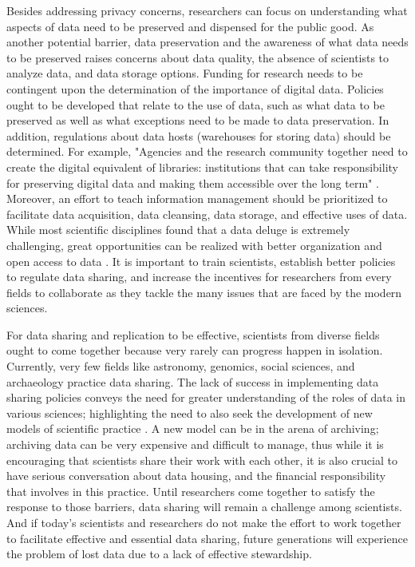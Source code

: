 \documentclass[sigconf]{acmart}
\begin{document}
Besides addressing privacy concerns, researchers can focus on understanding what aspects of data need to be preserved and dispensed for the public good. As another potential barrier, data preservation and the awareness of what data needs to be preserved raises concerns about data quality, the absence of scientists to analyze data, and data storage options. Funding for research needs to be contingent upon the determination of the importance of digital data. Policies ought to be developed that relate to the use of data, such as what data to be preserved as well as what exceptions need to be made to data preservation. In addition, regulations about data hosts (warehouses for storing data) should be determined. For example, "Agencies and the research community together need to create the digital equivalent of libraries: institutions that can take responsibility for preserving digital data and making them accessible over the long term" \cite{pryor2009skilling}.  Moreover, an effort to teach information management should be prioritized to facilitate data acquisition, data cleansing, data storage, and effective uses of data. While most scientific disciplines found that a data deluge is extremely challenging, great opportunities can be realized with better organization and open access to data \cite{economic22challenges}. It is important to train scientists, establish better policies to regulate data sharing, and increase the incentives for researchers from every fields to collaborate as they tackle the many issues that are faced by the modern sciences.


For data sharing and replication to be effective, scientists from diverse fields ought to come together because very rarely can progress happen in isolation. Currently, very few fields like astronomy, genomics, social sciences, and archaeology practice data sharing. The lack of success in implementing data sharing policies conveys the need for greater understanding of the roles of data in various sciences; highlighting the need to also seek the development of new models of scientific practice \cite{borgman2015if}. A new model can be in the arena of archiving; archiving data can be very expensive and difficult to manage, thus while it is encouraging that scientists share their work with each other, it is also crucial to have serious conversation about data housing, and the financial responsibility that involves in this practice. Until researchers come together to satisfy the response to those barriers, data sharing will remain a challenge among scientists. And if today's scientists and researchers do not make the effort to work together to facilitate effective and essential data sharing, future generations will experience the problem of lost data due to a lack of effective stewardship. 
\end{document}
